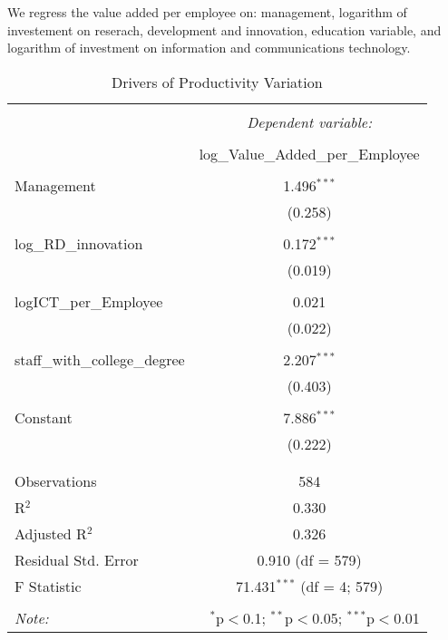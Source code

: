 \documentclass[]{article}
\begin{document}
We regress the value added per employee on: management, logarithm of
investement on reserach, development and innovation, education variable,
and logarithm of investment on information and communications
technology.

\begin{table}[!htbp] \centering 
  \caption{Drivers of Productivity Variation} 
  \label{} 
\begin{tabular}{@{\extracolsep{5pt}}lc} 
\\[-1.8ex]\hline 
\hline \\[-1.8ex] 
 & \multicolumn{1}{c}{\textit{Dependent variable:}} \\ 
\cline{2-2} 
\\[-1.8ex] & log\_Value\_Added\_per\_Employee \\ 
\hline \\[-1.8ex] 
 Management & 1.496$^{***}$ \\ 
  & (0.258) \\ 
  & \\ 
 log\_RD\_innovation & 0.172$^{***}$ \\ 
  & (0.019) \\ 
  & \\ 
 logICT\_per\_Employee & 0.021 \\ 
  & (0.022) \\ 
  & \\ 
 staff\_with\_college\_degree & 2.207$^{***}$ \\ 
  & (0.403) \\ 
  & \\ 
 Constant & 7.886$^{***}$ \\ 
  & (0.222) \\ 
  & \\ 
\hline \\[-1.8ex] 
Observations & 584 \\ 
R$^{2}$ & 0.330 \\ 
Adjusted R$^{2}$ & 0.326 \\ 
Residual Std. Error & 0.910 (df = 579) \\ 
F Statistic & 71.431$^{***}$ (df = 4; 579) \\ 
\hline 
\hline \\[-1.8ex] 
\textit{Note:}  & \multicolumn{1}{r}{$^{*}$p$<$0.1; $^{**}$p$<$0.05; $^{***}$p$<$0.01} \\ 
\end{tabular} 
\end{table}
\end{document}
